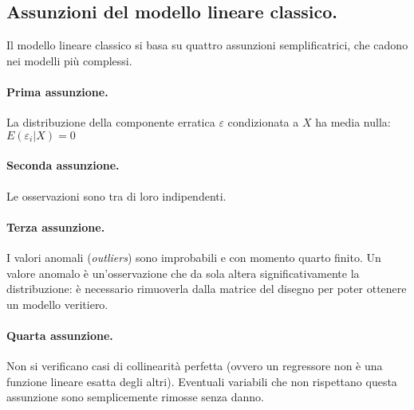 \documentclass[11pt]{article}
\begin{document}
\subsection{Assunzioni del modello lineare classico.}
Il modello lineare classico si basa su quattro assunzioni semplificatrici, che cadono nei modelli più complessi.

\paragraph{Prima assunzione.}
La distribuzione della componente erratica $\varepsilon$ condizionata a $X$ ha media nulla: $E(\varepsilon_i | X) = 0$

\paragraph{Seconda assunzione.}
Le osservazioni sono tra di loro indipendenti.

\paragraph{Terza assunzione.}
I valori anomali (\textit{outliers}) sono improbabili e con momento quarto finito.
Un valore anomalo è un'osservazione che da sola altera significativamente la distribuzione: è necessario rimuoverla dalla matrice del disegno per poter ottenere un modello veritiero.

\paragraph{Quarta assunzione.}
Non si verificano casi di collinearità perfetta (ovvero un regressore non è una funzione lineare esatta degli altri).
Eventuali variabili che non rispettano questa assunzione sono semplicemente rimosse senza danno.

\end{document}
